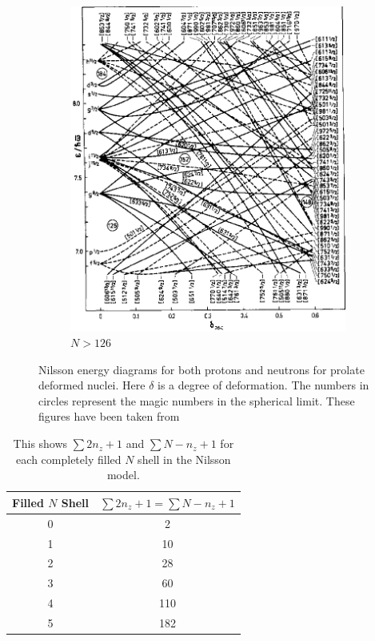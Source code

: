 \documentclass[10pt,a4paper, twoside]{report}
\begin{document}
\begin{figure}
\begin{subfigure}[b]{0.48\textwidth}
    \includegraphics[width=\textwidth]{./figures/Nilsson/neutron_deformed126.png}
    \caption{$N>126$}
\end{subfigure}
\caption{Nilsson energy diagrams for both protons and neutrons for prolate deformed nuclei. Here $\delta$ is a degree of deformation. The numbers in circles represent the magic numbers in the spherical limit. These figures have been taken from \cite{BohrMottVol2}}

\end{figure}



\begin{table} 
\centering
\begin{tabular}{c|c}
\toprule
\toprule
Filled $N$ Shell & $\sum 2n_z + 1 = \sum N - n_z + 1$ \\ [2pt]
\midrule
0 & 2\\
1 & 10\\
2 & 28\\
3 & 60\\
4 & 110\\
5 & 182 \\
\bottomrule
\bottomrule
\end{tabular}
\caption{This shows $\sum 2n_z + 1$ and $\sum N - n_z + 1$  for each completely filled $N$ shell in the Nilsson model. \label{table:FullShellNz} %
}
\end{table}
\end{document}
